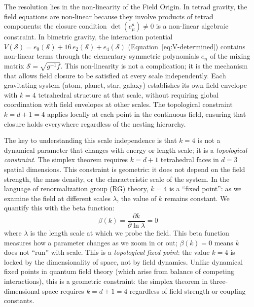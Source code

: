 \documentclass[aps,prd,preprint,superscriptaddress,showpacs,preprintnumbers,amsmath,amssymb,nofootinbib]{revtex4-2}
\begin{document}
The resolution lies in the non-linearity of the Field Origin. In tetrad gravity, the field equations are non-linear because they involve products of tetrad components: the closure condition $\det(e_\mu^a) \neq 0$ is a non-linear algebraic constraint. In bimetric gravity, the interaction potential $V(\mathcal{S}) = e_0(\mathcal{S}) + 16\,e_2(\mathcal{S}) + e_4(\mathcal{S})$ (Equation~\ref{eq:V-determined}) contains non-linear terms through the elementary symmetric polynomials $e_n$ of the mixing matrix $\mathcal{S} = \sqrt{g^{-1}f}$. This non-linearity is not a complication; it is the mechanism that allows field closure to be satisfied at every scale independently. Each gravitating system (atom, planet, star, galaxy) establishes its own field envelope with $k=4$ tetrahedral structure at that scale, without requiring global coordination with field envelopes at other scales. The topological constraint $k = d+1 = 4$ applies locally at each point in the continuous field, ensuring that closure holds everywhere regardless of the nesting hierarchy.


The key to understanding this scale independence is that $k=4$ is not a dynamical parameter that changes with energy or length scale; it is a \emph{topological constraint}. The simplex theorem requires $k = d+1$ tetrahedral faces in $d=3$ spatial dimensions. This constraint is geometric: it does not depend on the field strength, the mass density, or the characteristic scale of the system. In the language of renormalization group (RG) theory, $k=4$ is a ``fixed point'': as we examine the field at different scales $\lambda$, the value of $k$ remains constant. We quantify this with the beta function:
\begin{equation}
\beta(k) = \frac{\partial k}{\partial \ln \lambda} = 0
\label{eq:beta-function}
\end{equation}
where $\lambda$ is the length scale at which we probe the field. This beta function measures how a parameter changes as we zoom in or out; $\beta(k) = 0$ means $k$ does not ``run'' with scale. This is a \emph{topological fixed point}: the value $k=4$ is locked by the dimensionality of space, not by field dynamics. Unlike dynamical fixed points in quantum field theory (which arise from balance of competing interactions), this is a geometric constraint: the simplex theorem in three-dimensional space requires $k = d+1 = 4$ regardless of field strength or coupling constants.
\end{document}
